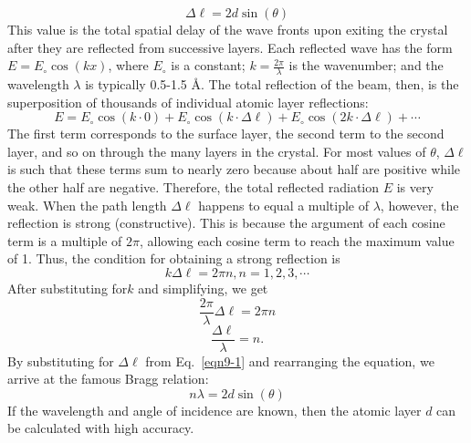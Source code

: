 \begin{equation}\label{eqn9-1}
\Delta\ell = 2 d \sin\left(\theta\right)
\end{equation}
This value is the total spatial delay of the wave fronts upon exiting the crystal after they are reflected from successive layers.  Each reflected wave has the form $E=E_{\circ}\cos\left(kx\right)$, where $E_{\circ}$ is a constant; $k=\frac{2\pi}{\lambda}$ is the wavenumber; and the wavelength $\lambda$ is typically 0.5-1.5 $\text{\AA}$.  The total reflection of the beam, then, is the superposition of thousands of individual atomic layer reflections:
\begin{equation}\label{eqn9-2}
E=E_{\circ}\cos\left(k\cdot0\right)+E_{\circ}\cos\left(k\cdot\Delta\ell\right)+E_{\circ}\cos\left(2k\cdot\Delta\ell\right)+\cdots
\end{equation}
The first term corresponds to the surface layer, the second term to the second layer, and so on through the many layers in the crystal.  For most values of $\theta$, $\Delta\ell$ is such that these terms sum to nearly zero because about half are positive while the other half are negative.  Therefore, the total reflected radiation $E$ is very weak.  When the path length $\Delta\ell$ happens to equal a multiple of $\lambda$, however, the reflection is strong (constructive).  This is because the argument of each cosine term is a multiple of $2\pi$, allowing each cosine term to reach the maximum value of 1.  Thus, the condition for obtaining a strong reflection is
 \begin{equation}\label{eqn9-3}
k\Delta\ell=2\pi n, n=1, 2, 3, \cdots
\end{equation}
After substituting for$ k$ and simplifying, we get
$$\frac{2\pi}{\lambda}\Delta\ell=2\pi n$$
$$\frac{\Delta\ell}{\lambda}=n.$$
By substituting for $\Delta\ell$ from Eq.~\ref{eqn9-1} and rearranging the equation, we arrive at the famous Bragg relation:
\begin{equation}\label{eqn9-4}
n\lambda=2d\sin\left(\theta\right)
\end{equation}
If the wavelength and angle of incidence are known, then the atomic layer $d$ can be calculated with high accuracy.  

